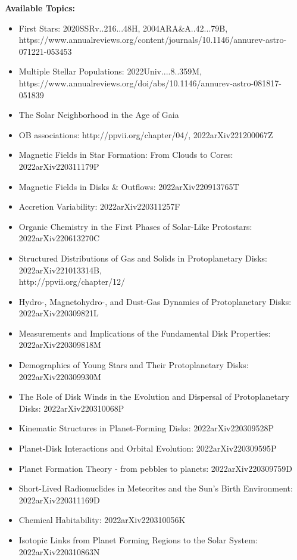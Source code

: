 \documentclass{article}
\begin{document}
\noindent \textbf{Available Topics:}
\begin{itemize}
    \item First Stars: 2020SSRv..216...48H, 2004ARA\&A..42...79B, https://www.annualreviews.org/content/journals/10.1146/annurev-astro-071221-053453
    \item Multiple Stellar Populations: 2022Univ....8..359M, https://www.annualreviews.org/doi/abs/10.1146/annurev-astro-081817-051839
    \item The Solar Neighborhood in the Age of Gaia
    \item OB associations: http://ppvii.org/chapter/04/, 2022arXiv221200067Z
    \item Magnetic Fields in Star Formation: From Clouds to Cores: 2022arXiv220311179P
    \item Magnetic Fields in Disks \& Outflows: 2022arXiv220913765T
    \item Accretion Variability: 2022arXiv220311257F
    \item Organic Chemistry in the First Phases of Solar-Like Protostars: 2022arXiv220613270C
    \item Structured Distributions of Gas and Solids in Protoplanetary Disks: 2022arXiv221013314B,\\ http://ppvii.org/chapter/12/
    \item Hydro-, Magnetohydro-, and Dust-Gas Dynamics of Protoplanetary Disks: 2022arXiv220309821L
    \item Measurements and Implications of the Fundamental Disk Properties: 2022arXiv220309818M
    \item Demographics of Young Stars and Their Protoplanetary Disks: 2022arXiv220309930M
    \item The Role of Disk Winds in the Evolution and Dispersal of Protoplanetary Disks: 2022arXiv220310068P
    \item Kinematic Structures in Planet-Forming Disks: 2022arXiv220309528P
    \item Planet-Disk Interactions and Orbital Evolution: 2022arXiv220309595P
    \item Planet Formation Theory - from pebbles to planets: 2022arXiv220309759D
    \item Short-Lived Radionuclides in Meteorites and the Sun’s Birth Environment: 2022arXiv220311169D
    \item Chemical Habitability: 2022arXiv220310056K
    \item Isotopic Links from Planet Forming Regions to the Solar System: 2022arXiv220310863N

\end{itemize}
\end{document}
